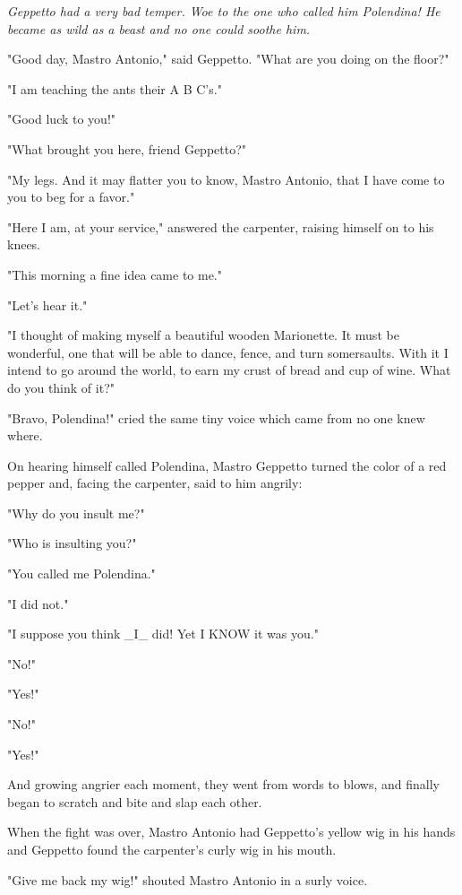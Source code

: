 \documentclass[12pt,twoside,twocolumn]{article}
\begin{document}
\bigskip
{\slshape%
  Geppetto had a very bad temper.  Woe to the one who
  called him Polendina!  He became as wild as a beast and
  no one could soothe him.
  
  "Good day, Mastro Antonio," said Geppetto.  "What
  are you doing on the floor?"
  
  "I am teaching the ants their A B C's."
  
  "Good luck to you!"
  
  "What brought you here, friend Geppetto?"
  
  "My legs.  And it may flatter you to know, Mastro
  Antonio, that I have come to you to beg for a favor."
  
  "Here I am, at your service," answered the carpenter,
  raising himself on to his knees.
  
  "This morning a fine idea came to me."
  
  "Let's hear it."
  
  "I thought of making myself a beautiful wooden
  Marionette.  It must be wonderful, one that will be able to
  dance, fence, and turn somersaults.  With it I intend to go
  around the world, to earn my crust of bread and cup of
  wine.  What do you think of it?"
  
  "Bravo, Polendina!" cried the same tiny voice which
  came from no one knew where.
  
  On hearing himself called Polendina, Mastro Geppetto
  turned the color of a red pepper and, facing the carpenter,
  said to him angrily:
  
  "Why do you insult me?"
  
  "Who is insulting you?"
  
  "You called me Polendina."
  
  "I did not."
  
  "I suppose you think \_I\_ did!  Yet I KNOW it was you."
  
  "No!"
  
  "Yes!"
  
  "No!"
  
  "Yes!"
  
  And growing angrier each moment, they went from
  words to blows, and finally began to scratch and bite and
  slap each other.
  
  When the fight was over, Mastro Antonio had Geppetto's
  yellow wig in his hands and Geppetto found the carpenter's
  curly wig in his mouth.
  
  "Give me back my wig!" shouted Mastro Antonio in a surly voice.
  
}
\end{document}
